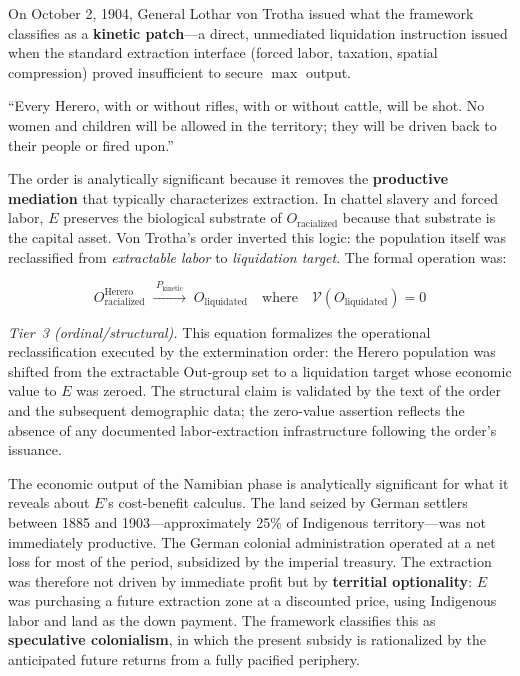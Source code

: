 On October 2, 1904, General Lothar von Trotha issued what the framework classifies as a \textbf{kinetic patch}---a direct, unmediated liquidation instruction issued when the standard extraction interface (forced labor, taxation, spatial compression) proved insufficient to secure $\max$ output.

\begin{historicalsource}
``Every Herero, with or without rifles, with or without cattle, will be shot. No women and children will be allowed in the territory; they will be driven back to their people or fired upon.''
\end{historicalsource}

The order is analytically significant because it removes the \textbf{productive mediation} that typically characterizes extraction. In chattel slavery and forced labor, $E$ preserves the biological substrate of $O_{\text{racialized}}$ because that substrate is the capital asset. Von Trotha's order inverted this logic: the population itself was reclassified from \textit{extractable labor} to \textit{liquidation target}. The formal operation was:

\begin{equation}\label{eq:german-liquidation-reclass}
O_{\text{racialized}}^{\text{Herero}} \; \xrightarrow{\;P_{\text{kinetic}}\;} \; O_{\text{liquidated}} \quad \text{where} \quad \mathcal{V}(O_{\text{liquidated}}) = 0
\end{equation}

\noindent\textit{Tier~3 (ordinal/structural).} This equation formalizes the operational reclassification executed by the extermination order: the Herero population was shifted from the extractable Out-group set to a liquidation target whose economic value to $E$ was zeroed. The structural claim is validated by the text of the order and the subsequent demographic data; the zero-value assertion reflects the absence of any documented labor-extraction infrastructure following the order's issuance.

The economic output of the Namibian phase is analytically significant for what it reveals about $E$'s cost-benefit calculus. The land seized by German settlers between 1885 and 1903---approximately 25\% of Indigenous territory---was not immediately productive. The German colonial administration operated at a net loss for most of the period, subsidized by the imperial treasury. The extraction was therefore not driven by immediate profit but by \textbf{territial optionality}: $E$ was purchasing a future extraction zone at a discounted price, using Indigenous labor and land as the down payment. The framework classifies this as \textbf{speculative colonialism}, in which the present subsidy is rationalized by the anticipated future returns from a fully pacified periphery.

